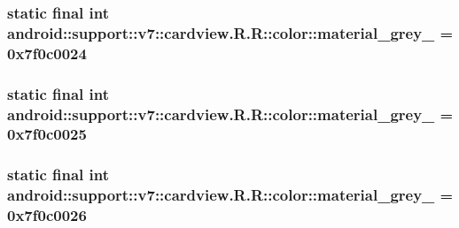 \hypertarget{classandroid_1_1support_1_1v7_1_1cardview_1_1_r_1_1color_feb64cbd6cf45137b5c184419076ac46}{
\subsubsection[{material\_\-grey\_\-100}]{\setlength{\rightskip}{0pt plus 5cm}static final int android::support::v7::cardview.R.R::color::material\_\-grey\_ = 0x7f0c0024}}
\label{classandroid_1_1support_1_1v7_1_1cardview_1_1_r_1_1color_feb64cbd6cf45137b5c184419076ac46}


\hypertarget{classandroid_1_1support_1_1v7_1_1cardview_1_1_r_1_1color_445086946e246aa2013a021a5d7e3000}{
\subsubsection[{material\_\-grey\_\-300}]{\setlength{\rightskip}{0pt plus 5cm}static final int android::support::v7::cardview.R.R::color::material\_\-grey\_ = 0x7f0c0025}}
\label{classandroid_1_1support_1_1v7_1_1cardview_1_1_r_1_1color_445086946e246aa2013a021a5d7e3000}


\hypertarget{classandroid_1_1support_1_1v7_1_1cardview_1_1_r_1_1color_19285be8783074ab38f371ecf8ed73be}{
\subsubsection[{material\_\-grey\_\-50}]{\setlength{\rightskip}{0pt plus 5cm}static final int android::support::v7::cardview.R.R::color::material\_\-grey\_ = 0x7f0c0026}}
\label{classandroid_1_1support_1_1v7_1_1cardview_1_1_r_1_1color_19285be8783074ab38f371ecf8ed73be}


